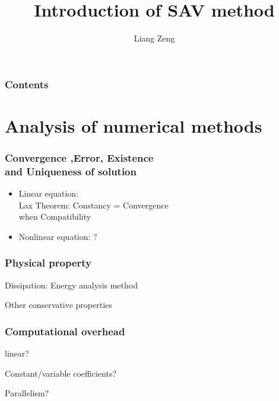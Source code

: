 \documentclass{beamer}
\title{Introduction of SAV method}
\author{Liang Zeng}
\begin{document}
\frame{\titlepage}
\begin{frame}
\frametitle{Contents}
  \tableofcontents
\end{frame}
\section{Analysis of numerical methods}

    \begin{frame}
    \frametitle{Convergence ,Error, Existence \\and Uniqueness of solution}

	\begin{itemize}
	\item Linear equation: \\
	Lax Theorem: Constancy = Convergence\\
	 when Compatibility
	\item Nonlinear equation: ?
	\end{itemize}
	

    \end{frame}
    \begin{frame}
    \frametitle{Physical property}
Dissipation: Energy analysis method

Other conservative properties

    \end{frame}

    \begin{frame}
    \frametitle{Computational overhead}

        linear?

    Constant/variable coefficients?

    Parallelism?

    \end{frame}
\end{document}
